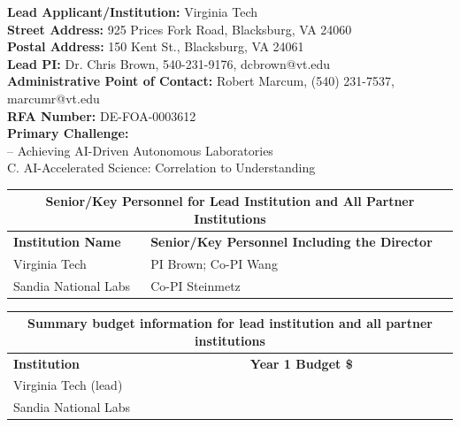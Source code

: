 \documentclass{files/proposalnsf}
\begin{document}
\textbf{Lead Applicant/Institution:} Virginia Tech \\

\noindent\textbf{Street Address:} 925 Prices Fork Road, Blacksburg, VA 24060 \\

\noindent\textbf{Postal Address:} 150 Kent St., Blacksburg, VA 24061\\

\noindent\textbf{Lead PI:} Dr. Chris Brown, 540-231-9176, dcbrown@vt.edu \\

\noindent\textbf{Administrative Point of Contact:} Robert Marcum, (540) 231-7537, marcumr@vt.edu \\

\noindent\textbf{RFA Number:} DE-FOA-0003612 \\

\noindent\textbf{Primary Challenge:} \\

 -- Achieving AI-Driven Autonomous Laboratories \\
C. AI-Accelerated Science: Correlation to Understanding \\

\begin{table}[h]
    \begin{tabular}{|l|l|}
    \hline
    \multicolumn{2}{|c|}{\textbf{Senior/Key Personnel for Lead Institution and All Partner Institutions}}  \\ \hline
        \textbf{Institution Name} & \textbf{Senior/Key Personnel Including the Director} \\ \hline
        Virginia Tech & PI Brown; Co-PI Wang \\ \hline
        Sandia National Labs & Co-PI Steinmetz \\ \hline
    \end{tabular}
    \label{tab:my_label}
\end{table}

\begin{table}[h]
    \begin{tabular}{|l|l|}
    \hline
    \multicolumn{2}{|c|}{\textbf{Summary budget information for lead institution and all partner institutions}}    \\ \hline
    \textbf{Institution} & \textbf{Year 1 Budget \$} \\ \hline
        Virginia Tech (lead) & \todo{} \\ \hline
        Sandia National Labs &  \todo{} \\ \hline
    \end{tabular}
    \label{tab:my_label}
\end{table}
\end{document}

